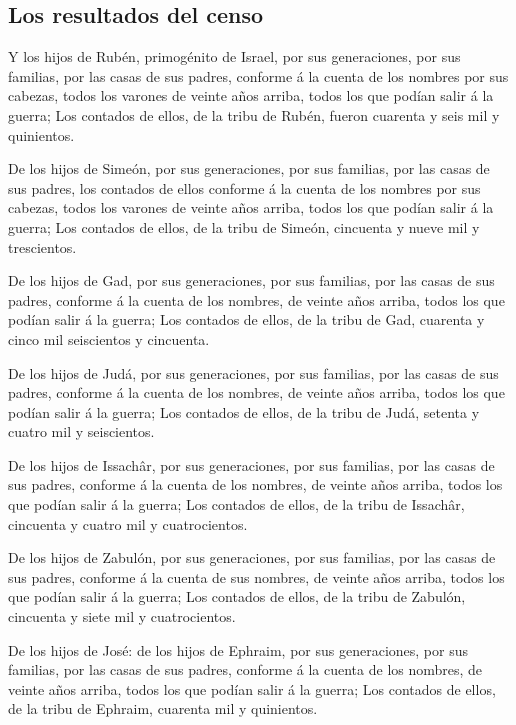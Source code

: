 \hypertarget{los-resultados-del-censo}{%
\subsection{Los resultados del censo}\label{los-resultados-del-censo}}

 Y los hijos de Rubén, primogénito de Israel, por sus
generaciones, por sus familias, por las casas de sus padres, conforme á
la cuenta de los nombres por sus cabezas, todos los varones de veinte
años arriba, todos los que podían salir á la guerra;  Los
contados de ellos, de la tribu de Rubén, fueron cuarenta y seis mil y
quinientos.

 De los hijos de Simeón, por sus generaciones, por sus
familias, por las casas de sus padres, los contados de ellos conforme á
la cuenta de los nombres por sus cabezas, todos los varones de veinte
años arriba, todos los que podían salir á la guerra;  Los
contados de ellos, de la tribu de Simeón, cincuenta y nueve mil y
trescientos.

 De los hijos de Gad, por sus generaciones, por sus
familias, por las casas de sus padres, conforme á la cuenta de los
nombres, de veinte años arriba, todos los que podían salir á la guerra;
 Los contados de ellos, de la tribu de Gad, cuarenta y
cinco mil seiscientos y cincuenta.

 De los hijos de Judá, por sus generaciones, por sus
familias, por las casas de sus padres, conforme á la cuenta de los
nombres, de veinte años arriba, todos los que podían salir á la guerra;
 Los contados de ellos, de la tribu de Judá, setenta y
cuatro mil y seiscientos.

 De los hijos de Issachâr, por sus generaciones, por sus
familias, por las casas de sus padres, conforme á la cuenta de los
nombres, de veinte años arriba, todos los que podían salir á la guerra;
 Los contados de ellos, de la tribu de Issachâr, cincuenta
y cuatro mil y cuatrocientos.

 De los hijos de Zabulón, por sus generaciones, por sus
familias, por las casas de sus padres, conforme á la cuenta de sus
nombres, de veinte años arriba, todos los que podían salir á la guerra;
 Los contados de ellos, de la tribu de Zabulón, cincuenta y
siete mil y cuatrocientos.

 De los hijos de José: de los hijos de Ephraim, por sus
generaciones, por sus familias, por las casas de sus padres, conforme á
la cuenta de los nombres, de veinte años arriba, todos los que podían
salir á la guerra;  Los contados de ellos, de la tribu de
Ephraim, cuarenta mil y quinientos.

